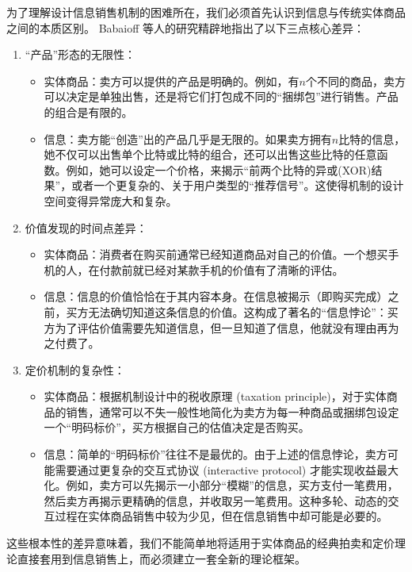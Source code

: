  为了理解设计信息销售机制的困难所在，我们必须首先认识到信息与传统实体商品之间的本质区别。
 Babaioff 等人的研究精辟地指出了以下三点核心差异：

 \begin{enumerate}
   \item “产品”形态的无限性：
      \begin{itemize}
        \item 实体商品：卖方可以提供的产品是明确的。例如，有$n$个不同的商品，卖方可以决定是单独出售，还是将它们打包成不同的“捆绑包”进行销售。产品的组合是有限的。
        \item 信息：卖方能“创造”出的产品几乎是无限的。如果卖方拥有$n$比特的信息，她不仅可以出售单个比特或比特的组合，还可以出售这些比特的任意函数。例如，她可以设定一个价格，来揭示“前两个比特的异或(XOR)结果”，或者一个更复杂的、关于用户类型的“推荐信号”。这使得机制的设计空间变得异常庞大和复杂。
      \end{itemize}
   \item 价值发现的时间点差异：
      \begin{itemize}
        \item 实体商品：消费者在购买前通常已经知道商品对自己的价值。一个想买手机的人，在付款前就已经对某款手机的价值有了清晰的评估。
        \item 信息：信息的价值恰恰在于其内容本身。在信息被揭示（即购买完成）之前，买方无法确切知道这条信息的价值。这构成了著名的“信息悖论”：买方为了评估价值需要先知道信息，但一旦知道了信息，他就没有理由再为之付费了。
      \end{itemize}
   \item 定价机制的复杂性：
      \begin{itemize}
        \item 实体商品：根据机制设计中的税收原理 (taxation principle)，对于实体商品的销售，通常可以不失一般性地简化为卖方为每一种商品或捆绑包设定一个“明码标价”，买方根据自己的估值决定是否购买。
        \item 信息：简单的“明码标价”往往不是最优的。由于上述的信息悖论，卖方可能需要通过更复杂的交互式协议 (interactive protocol) 才能实现收益最大化。例如，卖方可以先揭示一小部分“模糊”的信息，买方支付一笔费用，然后卖方再揭示更精确的信息，并收取另一笔费用。这种多轮、动态的交互过程在实体商品销售中较为少见，但在信息销售中却可能是必要的。
      \end{itemize}
 \end{enumerate}

 这些根本性的差异意味着，我们不能简单地将适用于实体商品的经典拍卖和定价理论直接套用到信息销售上，而必须建立一套全新的理论框架。

